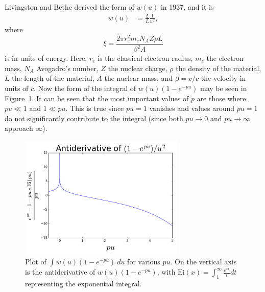 Livingston and Bethe \cite{livingston} derived the form of $w(u)$ in 1937, and it is
\begin{align*}
w(u)&=\frac{\xi}{L}\frac{1}{u^2},
\end{align*}
where
\begin{equation}\label{eqn:xi}
\xi=\frac{2\pi r_e ^2 m_e N_A Z\rho L}{\beta^2 A}
\end{equation}
is in units of energy. Here, $r_e$ is the classical electron radius, $m_e$ the electron mass, $N_A$ Avogadro's number, $Z$ the nuclear charge, $\rho$ the density of the material, $L$ the length of the material, $A$ the nuclear mass, and $\beta=v/c$ the velocity in units of $c$. Now the form of the integral of $w(u)(1-e^{-pu})$ may be seen in Figure~\ref{fig:landauPUPlot}. It can be seen that the most important values of $p$ are those where $pu \ll 1$ and $1 \ll pu$. This is true since $pu=1$ vanishes and values around $pu=1$ do not significantly contribute to the integral (since both $pu\rightarrow 0$ and $pu\rightarrow\infty$ approach $\infty$).

\begin{figure}[h!]
  \centering
    \includegraphics[width=0.7\textwidth]{Figures/landauPUPlot} 
  \caption[Plot of $\int w(u)(1-e^{-pu})\ du$.]{Plot of $\int w(u)(1-e^{-pu})\ du$ for various $pu$. On the vertical axis is the antiderivative of $w(u)(1-e^{-pu})$, with $\text{Ei}(x)=\int_1 ^\infty \frac{e^{xt}}{t}dt$ representing the exponential integral.}
  \label{fig:landauPUPlot}
\end{figure}

